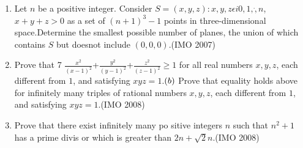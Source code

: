 \begin{enumerate}
\item Let $n$ be a positive integer. Consider           $S={(x,y,z)} : {x,y,z} \epsilon i{0,1,\dot,n}$,     ${x+y+z>0}$  as a set of $(n+1)^{3}-1$ points in three-dimensional space.Determine the smallest possible number of planes, the union of which contains $S$ but doesnot include $(0,0,0)$.\hfill(IMO 2007) 
	\item Prove that                                         7 $\frac{x^2}{{(x-1)}^{2}}$+$\frac{y^2}{{(y-1)}^{2}}$+$\frac{z^2}{{(z-1)}^{2}} \geq 1$
	for all real numbers $x, y, z$, each different from $1$, and satisfying $xyz = 1$.$\left(b\right)$  Prove that equality holds above for infinitely many triples of rational numbers $x, y, z$, each different from  $1$, and satisfying $xyz=1$.\hfill(IMO 2008)
\item Prove that there exist infinitely many po    sitive integers $n$ such that $n^2+1$ has a prime divis    or which is greater than $2n+\sqrt2n$.\hfill(IMO 2008)


\end{enumerate}
